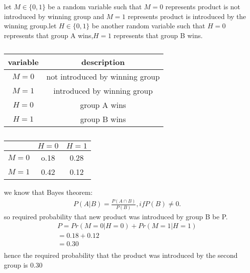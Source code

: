 let $M \in \{0,1\}$ be a random variable such that $M=0$ represents product is not introduced by winning group and $M=1$ represents product is introduced by the winning group.let $H \in \{0,1\}$ be another random variable such that $H=0$ represents that group A wins,$H=1$ represents that group B wins.
\begin{table}[h]
\centering 
\caption{}
\begin{tabular}{|c|c|}
\hline
variable & description \\
\hline
$M = 0$  &not introduced by winning group \\
\hline
$M = 1$  &introduced by winning group \\
\hline
$H = 0$  & group A wins \\
\hline
$H = 1$  & group B wins \\
\hline
\end{tabular}
\label{bayes/2/8/table:}
\end{table}
\begin{table}[h]
\centering 
\caption{}
\begin{tabular}{|c|c|c|}
\hline
           & $H = 0$  & $H = 1$\\
\hline
$M = 0$  & o.18  & 0.28 \\
\hline
$M = 1$  & 0.42    &  0.12 \\
\hline
\end{tabular}
\label{bayes/2/8/table:}
\end{table}
we know that Bayes theorem:
\begin{align}
P(A|B)=\frac{P(A\cap B)}{P(B)} ,ifP(B)\neq 0.
\end{align}
so required probability that new product was introduced by group B be P.
\begin{align}
 P=Pr(M=0|H=0)+Pr(M=1|H=1)\\
 =0.18+0.12 \\ 
 =0.30\\
\end{align}
hence the required probability that the product was introduced by the second group is 0.30